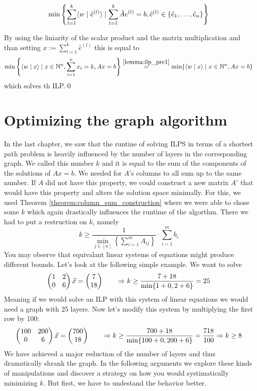 $$\min\left\{\sum_{l=1}^{k} \langle w \mid \hat e^{(l)} \rangle \mid \sum_{l=1}^{k}\hat Ae^{(l)} = b, \hat e^{(l)} \in \{\hat e_{1}, \dots, \hat e_n\}\right\}$$

By using the liniarity of the scalar product and the matrix multiplication and than setting $x := \sum_{l=1}^{k}\hat e^{(l)}$ this is equal to 
$$\min\left\{\langle w \mid x \rangle \mid x \in \mathbb{N}^n, \sum_{i=1}^{n}x_i = k , Ax=b\right\} \stackrel{\ref{lemma:ilp_pre1}}{=} \min\{\langle w \mid x \rangle \mid x \in \mathbb{N}^n, Ax=b\}$$
which solves th ILP.\qed

\section{Optimizing the graph algorithm}
In the last chapter, we saw that the runtine of solving ILPS in terms of a shortest path problem is heavily influenced by the number of layers in the corresponding graph. We called this number $k$ and it is equal to the sum of the components of the solutions of $Ax=b$. We needed for $A$'s columns to all sum up to the same number. If $A$ did not have this property, we could construct a new matrix $A'$ that would have this property and alters the solution space minimally. For this, we used Theorem \ref{theorem:column_sum_construction} where we were able to chose some $k$ which again drastically influences the runtime of the algorthm. There we had to put a restruction on $k$, namely
$$k \geq \frac{1}{\min_{j \in [n]} \left\{ \sum_{i=1}^{m}A_{ij}\right\}}\cdot \sum_{i=1}^{m}b_i$$
You may observe that equivalant linear systems of equations might produce different bounds. Let's look at the following simple example. We want to solve 
$$\left(\begin{matrix}1&2\\0&6\end{matrix}\right)\vec x = \left(\begin{matrix}7\\18\end{matrix}\right) \qquad \Rightarrow k \geq \frac{7 + 18}{\min\{1+0, 2+6\}} = 25$$
Meaning if we would solve an ILP with this system of linear equations we would need a graph with 25 layers. Now let's modify this system by multiplying the first row by 100:
$$\left(\begin{matrix}100&200\\0&6\end{matrix}\right)\vec x = \left(\begin{matrix}700\\18\end{matrix}\right) \qquad \Rightarrow k \geq \frac{700 + 18}{\min\{100+0, 200+6\}} = \frac{718}{100} \Rightarrow k \geq 8$$
We have achieved a major reduction of the number of layers and thus dramatically shrank the graph. In the following arguments we explore these kinds of manipulations and discover a strategy on how you would systimatically minimizing $k$. But first, we have to undestand the behavior better.

